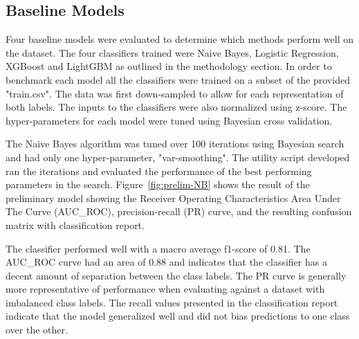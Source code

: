 \documentclass[journal,twoside,web]{ieeecolor}
\begin{document}
\subsection{Baseline Models}

Four baseline models were evaluated to determine which methods perform well on the dataset. The four classifiers trained were Naive Bayes, Logistic Regression, XGBoost and LightGBM as outlined in the methodology section. In order to benchmark each model all the classifiers were trained on a subset of the provided "train.csv". The data was first down-sampled to allow for each representation of both labels. The inputs to the classifiers were also normalized using z-score. The hyper-parameters for each model were tuned using Bayesian cross validation. 

The Naive Bayes algorithm was tuned over 100 iterations using Bayesian search and had only one hyper-parameter, "var-smoothing". The utility script developed ran the iterations and evaluated the performance of the best performing parameters in the search. Figure~\ref{fig:prelim-NB} shows the result of the preliminary model showing the Receiver Operating Characteristics Area Under The Curve (AUC\_ROC), precision-recall (PR) curve, and the resulting confusion matrix with classification report. 

The classifier performed well with a macro average f1-score of 0.81. The AUC\_ROC curve had an area of 0.88 and indicates that the classifier has a decent amount of separation between the class labels. The PR curve is generally more representative of performance when evaluating against a dataset with imbalanced class labels. The recall values presented in the classification report indicate that the model generalized well and did not bias predictions to one class over the other.
\end{document}
